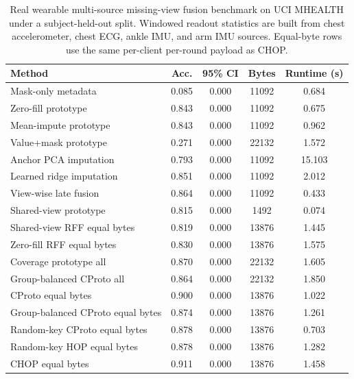 \begin{table}[t]
\centering
\caption{Real wearable multi-source missing-view fusion benchmark on UCI MHEALTH under a subject-held-out split. Windowed readout statistics are built from chest accelerometer, chest ECG, ankle IMU, and arm IMU sources. Equal-byte rows use the same per-client per-round payload as CHOP.}
\label{tab:if-mhealth-fusion}
\scriptsize
\setlength{\tabcolsep}{3pt}
\renewcommand{\arraystretch}{0.94}
\begin{tabular}{lcccc}
\toprule
Method & Acc. & 95\% CI & Bytes & Runtime (s) \\
\midrule
Mask-only metadata & 0.085 & 0.000 & 11092 & 0.684 \\
Zero-fill prototype & 0.843 & 0.000 & 11092 & 0.675 \\
Mean-impute prototype & 0.843 & 0.000 & 11092 & 0.962 \\
Value+mask prototype & 0.271 & 0.000 & 22132 & 1.572 \\
Anchor PCA imputation & 0.793 & 0.000 & 11092 & 15.103 \\
Learned ridge imputation & 0.851 & 0.000 & 11092 & 2.012 \\
View-wise late fusion & 0.864 & 0.000 & 11092 & 0.433 \\
Shared-view prototype & 0.815 & 0.000 & 1492 & 0.074 \\
Shared-view RFF equal bytes & 0.819 & 0.000 & 13876 & 1.445 \\
Zero-fill RFF equal bytes & 0.830 & 0.000 & 13876 & 1.575 \\
Coverage prototype all & 0.870 & 0.000 & 22132 & 1.605 \\
Group-balanced CProto all & 0.864 & 0.000 & 22132 & 1.850 \\
CProto equal bytes & 0.900 & 0.000 & 13876 & 1.022 \\
Group-balanced CProto equal bytes & 0.874 & 0.000 & 13876 & 1.261 \\
Random-key CProto equal bytes & 0.878 & 0.000 & 13876 & 0.703 \\
Random-key HOP equal bytes & 0.878 & 0.000 & 13876 & 1.282 \\
CHOP equal bytes & 0.911 & 0.000 & 13876 & 1.458 \\
\bottomrule
\end{tabular}
\end{table}
